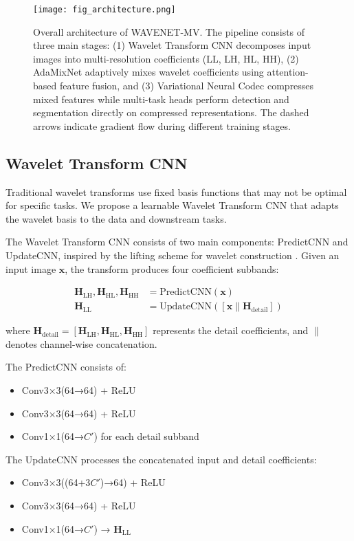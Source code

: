 \documentclass[conference]{IEEEtran}
\begin{document}
\begin{figure*}[htbp]
\centerline{\texttt{[image: fig\_architecture.png]}}
\caption{Overall architecture of WAVENET-MV. The pipeline consists of three main stages: (1) Wavelet Transform CNN decomposes input images into multi-resolution coefficients (LL, LH, HL, HH), (2) AdaMixNet adaptively mixes wavelet coefficients using attention-based feature fusion, and (3) Variational Neural Codec compresses mixed features while multi-task heads perform detection and segmentation directly on compressed representations. The dashed arrows indicate gradient flow during different training stages.}
\label{fig:architecture}
\end{figure*}

\subsection{Wavelet Transform CNN}

Traditional wavelet transforms use fixed basis functions that may not be optimal for specific tasks. We propose a learnable Wavelet Transform CNN that adapts the wavelet basis to the data and downstream tasks.

The Wavelet Transform CNN consists of two main components: PredictCNN and UpdateCNN, inspired by the lifting scheme for wavelet construction \cite{daubechies1998factoring}. Given an input image $\mathbf{x}$, the transform produces four coefficient subbands:

\begin{align}
\mathbf{H}_{\text{LH}}, \mathbf{H}_{\text{HL}}, \mathbf{H}_{\text{HH}} &= \text{PredictCNN}(\mathbf{x}) \\
\mathbf{H}_{\text{LL}} &= \text{UpdateCNN}([\mathbf{x} \| \mathbf{H}_{\text{detail}}])
\end{align}

where $\mathbf{H}_{\text{detail}} = [\mathbf{H}_{\text{LH}}, \mathbf{H}_{\text{HL}}, \mathbf{H}_{\text{HH}}]$ represents the detail coefficients, and $\|$ denotes channel-wise concatenation.

The PredictCNN consists of:
\begin{itemize}
\item Conv3×3(64→64) + ReLU
\item Conv3×3(64→64) + ReLU  
\item Conv1×1(64→$C'$) for each detail subband
\end{itemize}

The UpdateCNN processes the concatenated input and detail coefficients:
\begin{itemize}
\item Conv3×3((64+3$C'$)→64) + ReLU
\item Conv3×3(64→64) + ReLU
\item Conv1×1(64→$C'$) → $\mathbf{H}_{\text{LL}}$
\end{itemize}
\end{document}
